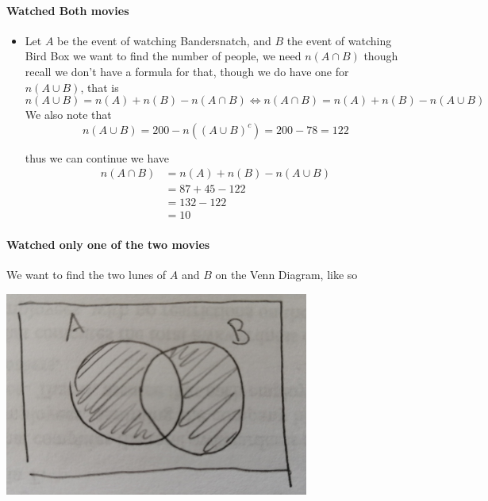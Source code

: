 \documentclass[11pt]{book}
\begin{document}
\paragraph{Watched Both movies} 
\begin{itemize}
    \item Let $A$ be the event of watching Bandersnatch, and $B$ the event of watching Bird Box we want to find the number of people, we need $n\left(A\cap B\right) $ though recall we don't have a formula for that, though we do have one for $n\left(A\cup B\right) $, that is 
        \[
        n\left(A\cup B\right) = n\left(A\right)  + n\left(B\right)  - n\left(A\cap B\right) \Leftrightarrow n\left(A\cap B\right) = n\left(A\right)  + n\left(B\right)  - n\left(A\cup B\right) 
        \]
        We also note that 
        \[
            n\left(A\cup B\right) = 200  - n\left(\left( A\cup B \right) ^{c} \right) = 200  - 78 = 122
        \]
        
        thus we can continue we have 
        \begin{align*}
            n\left(A\cap B\right) &= n\left(A\right)  + n\left(B\right)  - n\left(A\cup B\right) \\
            &= 87 + 45 - 122  \\ 
            &= 132 - 122  \\ 
            &= 10 
        \end{align*}
\end{itemize}

\paragraph{Watched only one of the two movies} 

We want to find the two lunes of $A$ and $B$  on the Venn Diagram, like so
\begin{center}
    \includegraphics[width=100mm]{assets/lec1_lune.jpg} 
\end{center}
\end{document}
